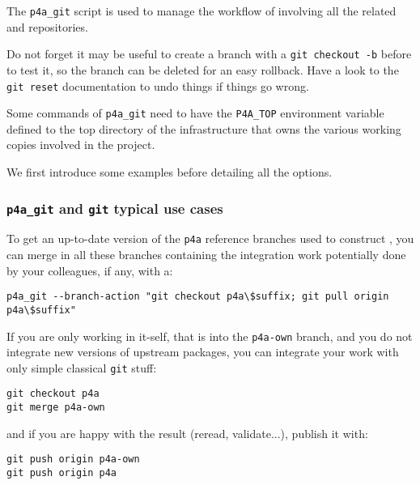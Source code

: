 \documentclass[a4paper]{article}
\begin{document}
The \verb|p4a_git| script is used to manage the workflow of \Apfa
involving all the related \Agit and \Asvn repositories.

Do not forget it may be useful to create a branch with a \texttt{git
  checkout -b} before to test it, so the branch can be deleted for an easy
rollback. Have a look to the \texttt{git reset} documentation to undo
things if things go wrong.

Some commands of \verb|p4a_git| need to have the \verb|P4A_TOP|
environment variable defined to the top directory of the \Apfa
infrastructure that owns the various \Agit working copies involved in the
project.

We first introduce some examples before detailing all the options.


\subsubsection{\protect\texttt{p4a\_git} and \protect\texttt{git} typical use cases}
\label{sec:p4a_git-typical-use}

To get an up-to-date version of the \Apfa \texttt{p4a} reference branches
used to construct \Apfa, you can merge in all these branches containing
the integration work potentially done by your colleagues, if any, with a:
\begin{verbatim}
p4a_git --branch-action "git checkout p4a\$suffix; git pull origin p4a\$suffix"
\end{verbatim}

If you are only working in \Apfa it-self, that is into the
\texttt{p4a-own} branch, and you do not integrate new versions of upstream
packages, you can integrate your work with only simple classical
\texttt{git} stuff:
\begin{verbatim}
git checkout p4a
git merge p4a-own
\end{verbatim}
and if you are happy with the result (reread, validate...), publish it
with:
\begin{verbatim}
git push origin p4a-own
git push origin p4a
\end{verbatim}
\end{document}
